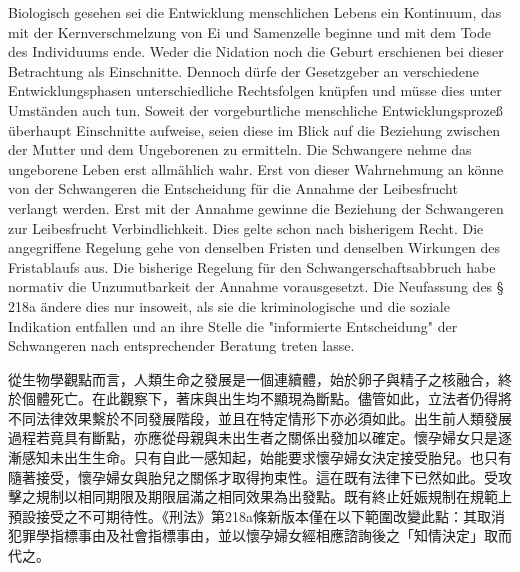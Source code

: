 \documentclass[12pt]{article}
\begin{document}
\begin{sourcepara}[title={原文C.16}]
Biologisch gesehen sei die Entwicklung menschlichen Lebens ein Kontinuum, das mit der Kernverschmelzung von Ei und Samenzelle beginne und mit dem Tode des Individuums ende. Weder die Nidation noch die Geburt erschienen bei dieser Betrachtung als Einschnitte. Dennoch dürfe der Gesetzgeber an verschiedene Entwicklungsphasen unterschiedliche Rechtsfolgen knüpfen und müsse dies unter Umständen auch tun. Soweit der vorgeburtliche menschliche Entwicklungsprozeß überhaupt Einschnitte aufweise, seien diese im Blick auf die Beziehung zwischen der Mutter und dem Ungeborenen zu ermitteln. Die Schwangere nehme das ungeborene Leben erst allmählich wahr. Erst von dieser Wahrnehmung an könne von der Schwangeren die Entscheidung für die Annahme der Leibesfrucht verlangt werden. Erst mit der Annahme gewinne die Beziehung der Schwangeren zur Leibesfrucht Verbindlichkeit. Dies gelte schon nach bisherigem Recht. Die angegriffene Regelung gehe von denselben Fristen und denselben Wirkungen des Fristablaufs aus. Die bisherige Regelung für den Schwangerschaftsabbruch habe normativ die Unzumutbarkeit der Annahme vorausgesetzt. Die Neufassung des § 218a \abbrStGB{} ändere dies nur insoweit, als sie die kriminologische und die soziale Indikation entfallen und an ihre Stelle die "informierte Entscheidung" der Schwangeren nach entsprechender Beratung treten lasse.
\end{sourcepara}
\begin{transpara}
從生物學觀點而言，人類生命之發展是一個連續體，始於卵子與精子之核融合，終於個體死亡。在此觀察下，著床與出生均不顯現為斷點。儘管如此，立法者仍得將不同法律效果繫於不同發展階段，並且在特定情形下亦必須如此。出生前人類發展過程若竟具有斷點，亦應從母親與未出生者之關係出發加以確定。懷孕婦女只是逐漸感知未出生生命。只有自此一感知起，始能要求懷孕婦女決定接受胎兒。也只有隨著接受，懷孕婦女與胎兒之關係才取得拘束性。這在既有法律下已然如此。受攻擊之規制以相同期限及期限屆滿之相同效果為出發點。既有終止妊娠規制在規範上預設接受之不可期待性。《刑法》第218a條新版本僅在以下範圍改變此點：其取消犯罪學指標事由及社會指標事由，並以懷孕婦女經相應諮詢後之「知情決定」取而代之。
\end{transpara}
\end{document}
